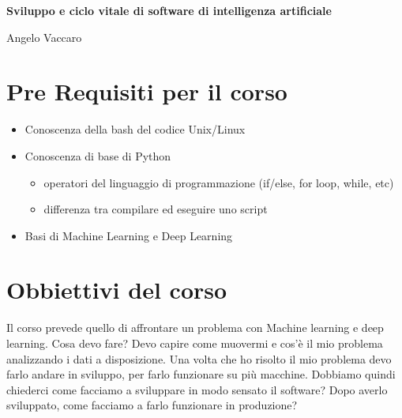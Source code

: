 \documentclass[a4paper,12pt]{article}
\begin{document}
\begin{titlepage}
    \centering
    \vspace*{5cm}
    {\Huge\bfseries Sviluppo e ciclo vitale di software di intelligenza artificiale\par}
    \vfill
    \begin{flushright}
        \large Angelo Vaccaro
    \end{flushright}
\end{titlepage}

\tableofcontents
\newpage

\section{Pre Requisiti per il corso}
\begin{itemize}
     \item Conoscenza della bash del codice Unix/Linux
     \item Conoscenza di base di Python
        \begin{itemize}
            \item operatori del linguaggio di programmazione (if/else, for loop, while, etc)
            \item differenza tra compilare ed eseguire uno script
        \end{itemize}
    \item Basi di Machine Learning e Deep Learning
\end{itemize}

\section{Obbiettivi del corso}
Il corso prevede quello di affrontare un problema con Machine learning e deep learning. Cosa devo fare?
Devo capire come muovermi e cos'è il mio problema analizzando i dati a disposizione.
Una volta che ho risolto il mio problema devo farlo andare in sviluppo, per farlo funzionare su più macchine.
Dobbiamo quindi chiederci come facciamo a sviluppare in modo sensato il software?
Dopo averlo sviluppato, come facciamo a farlo funzionare in produzione?
\end{document}
